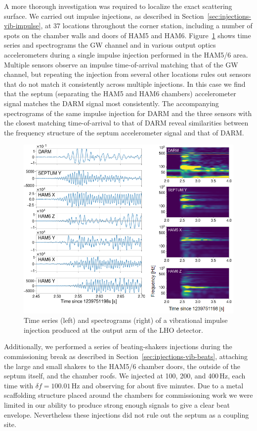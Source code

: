 A more thorough investigation was required to localize the exact scattering surface.
We carried out impulse injections, as described in Section~\ref{sec:injections-vib-impulse}, at 37 locations throughout the corner station, including a number of spots on the chamber walls and doors of HAM5 and HAM6.
Figure~\ref{fig:vib-impulse} shows time series and spectrograms the \ac{GW} channel and in various output optics accelerometers during a single impulse injection performed in the HAM5/6 area.
Multiple sensors observe an impulse time-of-arrival matching that of the \ac{GW} channel, but repeating the injection from several other locations rules out sensors that do not match it consistently across multiple injections.
In this case we find that the septum (separating the HAM5 and HAM6 chambers) accelerometer signal matches the \ac{DARM} signal most consistently.
The accompanying spectrograms of the same impulse injection for \ac{DARM} and the three sensors with the closest matching time-of-arrival to that of \ac{DARM} reveal similarities between the frequency structure of the septum accelerometer signal and that of \ac{DARM}.


\begin{figure}[htb]
	\centering
	\includegraphics[width=\textwidth]{figures/noise-studies/vib-impulse.png}
	\caption{
		Time series (left) and spectrograms (right) of a vibrational impulse injection produced at the output arm of the LHO detector.}
	\label{fig:vib-impulse}
\end{figure}

Additionally, we performed a series of beating-shakers injections during the commissioning break as described in Section~\ref{sec:injections-vib-beats}, attaching the large and small shakers to the HAM5/6 chamber doors, the outside of the septum itself, and the chamber roofs.
We injected at 100, 200, and 400\,Hz, each time with $\delta f = 100.01$\,Hz and observing for about five minutes.
Due to a metal scaffolding structure placed around the chambers for commissioning work we were limited in our ability to produce strong enough signals to give a clear beat envelope.
Nevertheless these injections did not rule out the septum as a coupling site.

